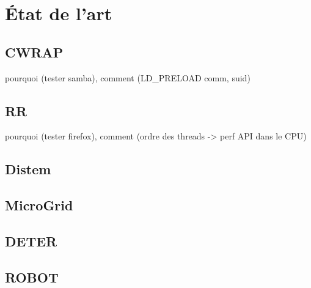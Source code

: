 \section{État de l'art}
\label{section:sota}
\subsection{CWRAP}
 pourquoi (tester samba), comment (LD\_PRELOAD comm, suid)

\subsection{RR}
 pourquoi (tester firefox), comment (ordre des threads -> perf API dans le CPU)
\subsection{Distem}
\subsection{MicroGrid}
\subsection{DETER}
\subsection{ROBOT}
